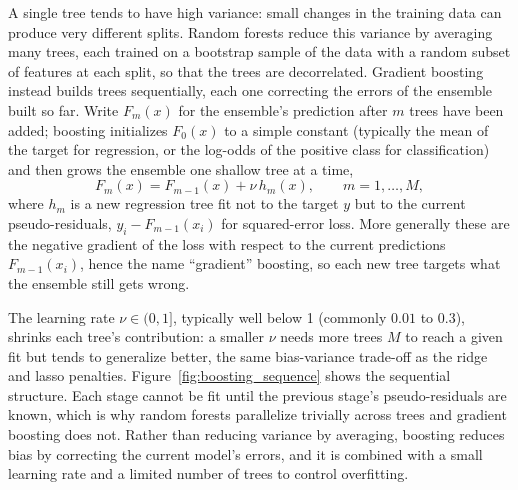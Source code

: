 \documentclass[../ai_in_finance]{subfiles}
\begin{document}
A single tree tends to have high variance: small changes in the training data can produce very different splits. Random forests reduce this variance by averaging many trees, each trained on a bootstrap sample of the data with a random subset of features at each split, so that the trees are decorrelated. Gradient boosting instead builds trees sequentially, each one correcting the errors of the ensemble built so far. Write $F_m(x)$ for the ensemble's prediction after $m$ trees have been added; boosting initializes $F_0(x)$ to a simple constant (typically the mean of the target for regression, or the log-odds of the positive class for classification) and then grows the ensemble one shallow tree at a time,
\begin{equation}
\label{eq:ml-boosting}
F_m(x) = F_{m-1}(x) + \nu \, h_m(x), \qquad m = 1, \dots, M,
\end{equation}
where $h_m$ is a new regression tree fit not to the target $y$ but to the current pseudo-residuals, $y_i - F_{m-1}(x_i)$ for squared-error loss. More generally these are the negative gradient of the loss with respect to the current predictions $F_{m-1}(x_i)$, hence the name ``gradient'' boosting, so each new tree targets what the ensemble still gets wrong.

The learning rate $\nu \in (0,1]$, typically well below 1 (commonly $0.01$ to $0.3$), shrinks each tree's contribution: a smaller $\nu$ needs more trees $M$ to reach a given fit but tends to generalize better, the same bias-variance trade-off as the ridge and lasso penalties. Figure~\ref{fig:boosting_sequence} shows the sequential structure. Each stage cannot be fit until the previous stage's pseudo-residuals are known, which is why random forests parallelize trivially across trees and gradient boosting does not.
Rather than reducing variance by averaging, boosting reduces bias by correcting the current model's errors, and it is combined with a small learning rate and a limited number of trees to control overfitting.
\end{document}
